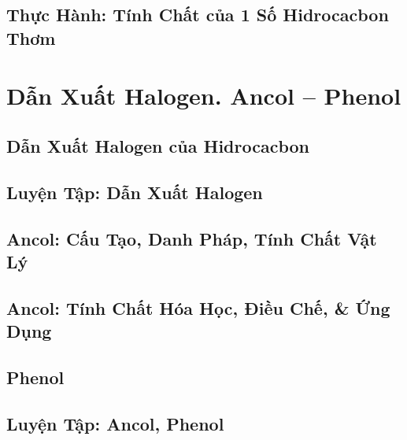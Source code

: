 \documentclass[oneside]{book}
\numberwithin{equation}{section}
\begin{document}
\section{Thực Hành: Tính Chất của 1 Số Hidrocacbon Thơm}


\chapter{Dẫn Xuất Halogen. Ancol -- Phenol}

\section{Dẫn Xuất Halogen của Hidrocacbon}


\section{Luyện Tập: Dẫn Xuất Halogen}


\section{Ancol: Cấu Tạo, Danh Pháp, Tính Chất Vật Lý}


\section{Ancol: Tính Chất Hóa Học, Điều Chế, \& Ứng Dụng}


\section{Phenol}


\section{Luyện Tập: Ancol, Phenol}
\end{document}
